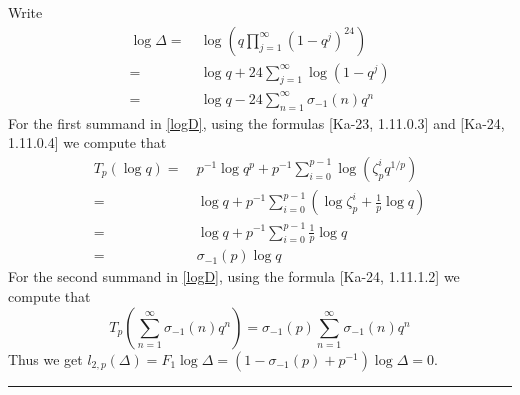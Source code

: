 \documentclass{rs}
\theoremstyle{definition}
\theoremstyle{remark}
\renewcommand{\D}{\Delta}
\newcommand{\si}{\sigma}
\renewcommand{\=}{\approx}
\renewcommand{\-}{\sim}
\numberwithin{equation}{section}
\numberwithin{thm}{section}
\begin{document}
Write 
\begin{equation}
 \label{logD}
 \begin{split}
  \log \D = & ~ \log \left( q \prod_{j=1}^\infty (1 - q^j)^{24} \right) \\
          = & ~ \log q + 24 \sum_{j=1}^\infty \log(1 - q^j) \\
          = & ~ \log q - 24 \sum_{n=1}^\infty \si_{-1}(n) q^n 
 \end{split}
\end{equation}
For the first summand in \eqref{logD}, using the formulas [Ka-23, 1.11.0.3] and [Ka-24, 1.11.0.4] we compute that 
\begin{equation*}
 \begin{split}
  T_p (\log q) = & ~ p^{-1} \log q^p + p^{-1} \sum_{i=0}^{p-1} \log(\zeta_p^i q^{1/p}) \\
               = & ~ \log q + p^{-1} \sum_{i=0}^{p-1} \left( \log \zeta_p^i + \frac{1}{p} \log q \right) \\
               = & ~ \log q + p^{-1} \sum_{i=0}^{p-1} \frac{1}{p} \log q \\
               = & ~ \si_{-1}(p) \log q 
 \end{split}
\end{equation*}
For the second summand in \eqref{logD}, 
using the formula [Ka-24, 1.11.1.2] we compute that 
\[
 T_p \left( \sum_{n=1}^\infty \si_{-1}(n) q^n \right) = \si_{-1}(p) \sum_{n=1}^\infty \si_{-1}(n) q^n 
\]
Thus we get $l_{2,p}(\D) = F_1 \log \D = (1 - \si_{-1}(p) + p^{-1}) \log \D = 0$.  \\

\hrule
\end{document}
